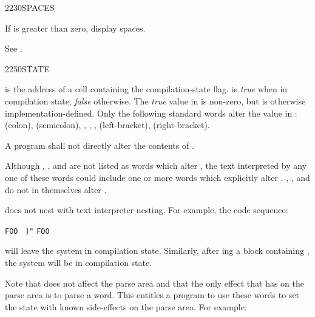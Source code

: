 \begin{worddef}{2230}{SPACES}
\item {}

	If  is greater than zero, display  spaces.

	\begin{testing} %
		See .
	\end{testing}
\end{worddef}


\begin{worddef}{2250}{STATE}
\item {}

	 is the address of a cell containing the
	compilation-state flag.  is \emph{true} when in
	compilation state, \emph{false} otherwise. The \emph{true} value
	in  is non-zero, but is otherwise
	implementation-defined. Only the following standard words alter
	the value in :
	\word{:} (colon),
	\word{;} (semicolon),
	,
	,
	,
	\word{[} (left-bracket),
	\word{]} (right-bracket).

\note
	A program shall not directly alter the contents of .

	\walso{core:[}
	\walso{core:]}

	\begin{rationale} %
		Although
		,
		,
		 and
		are not listed as words which alter , the text
		interpreted by any one of these words could include one or
		more words which explicitly alter .
		,
		,
		 and
		do not in themselves alter .

		 does not nest with text interpreter nesting. For
		example, the code sequence:

		\tab \word{:} \texttt{FOO}~
			 \texttt{]"} 
		\word{;}
		\qquad
		\texttt{FOO}

		will leave the system in compilation state. Similarly, after
		ing a block containing \word{]}, the system
		will be in compilation state.

		Note that \word{]} does not affect the parse area and that the
		only effect that \word{:} has on the parse area is to parse a
		word. This entitles a program to use these words to set the
		state with known side-effects on the parse area. For example:


\end{rationale}
\end{worddef}
